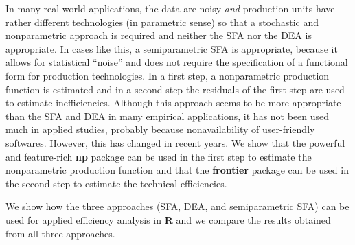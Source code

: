 \documentclass[10pt]{article}
\begin{document}
In many real world applications, the data are noisy \emph{and}
production units have rather different technologies (in parametric sense)
so that a stochastic and nonparametric approach is required
and neither the SFA nor the DEA is appropriate.
In cases like this,
a semiparametric SFA \cite{fan96}
is appropriate,
because it allows for statistical ``noise''
and does not require the specification of a functional form
for production technologies.
In a first step, a nonparametric production function is estimated
and in a second step the residuals of the first step
are used to estimate inefficiencies.
Although this approach seems to be more appropriate
than the SFA and DEA in many empirical applications,
it has not been used much in applied studies,
probably because nonavailability of user-friendly softwares.
However, this has changed in recent years.
We show that the powerful and feature-rich \textbf{np} package \cite{hayfield08}
can be used in the first step to estimate the nonparametric production function
and that the \textbf{frontier} package \cite{r-frontier-0.9}
can be used in the second step to estimate the technical efficiencies.

We show how the three approaches (SFA, DEA, and semiparametric SFA)
can be used for applied efficiency analysis in \textbf{R}
and we compare the results obtained from all three approaches.



\end{document}
